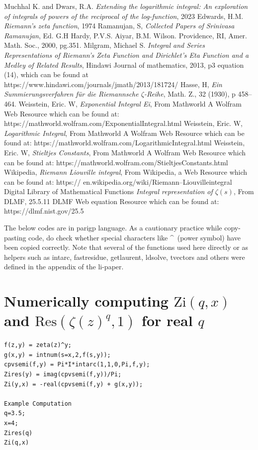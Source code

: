 \documentclass[a4paper,11pt,twoside]{amsart}
\newcommand\Zi{\mathrm{Zi}}
\newcommand\Res{\mathrm{Res}}
\begin{document}
\begin{thebibliography}{99} 
Muchhal K. and Dwars, R.A. \emph{Extending the logarithmic integral: An exploration of integrals of powers of the reciprocal of the log-function}, 2023
Edwards, H.M. \emph{Riemann's zeta function}, 1974
Ramanujan, S, \emph{Collected Papers of Srinivasa Ramanujan}, Ed. G.H Hardy, P.V.S. Aiyar, B.M. Wilson. Providence, RI, Amer. Math. Soc., 2000, pg.351.
Milgram, Michael S.  \emph{Integral and Series Representations of Riemann's Zeta Function and Dirichlet's Eta Function and a Medley of Related Results}, Hindawi Journal of mathematics, 2013, p3 equation (14), which can be found at https://www.hindawi.com/journals/jmath/2013/181724/
Hasse, H, \emph{Ein Summierungsverfahren für die Riemannsche $\zeta$-Reihe}, Math. Z., 32 (1930), p 458–464.
Weisstein, Eric. W, \emph{Exponential Integral Ei}, From Mathworld A Wolfram Web Resource which can be found at: https://mathworld.wolfram.com/ExponentialIntegral.html
Weisstein, Eric. W, \emph{Logarithmic Integral}, From Mathworld A Wolfram Web Resource which can be found at: https://mathworld.wolfram.com/LogarithmicIntegral.html
Weisstein, Eric. W, \emph{Stieltjes Constants}, From Mathworld A Wolfram Web Resource which can be found at:   https://mathworld.wolfram.com/StieltjesConstants.html
Wikipedia, \emph{Riemann Liouville integral}, From Wikipedia, a Web Resource which can be found at:  https://
en.wikipedia.org/wiki/Riemann–Liouvilleintegral
Digital Library of Mathematical Functions \emph{Integral representation of $\zeta(s)$}, From DLMF, 25.5.11	DLMF Web equation  Resource which can be found at:  https://dlmf.nist.gov/25.5
\end{thebibliography} 

\appendix
\appendixpage
The below codes are in parigp language. As a cautionary practice while copy-pasting code, do check whether special characters like \textasciicircum \, (power symbol) have been copied correctly. Note that several of the functions used here directly or as helpers such as intarc, fastresidue, getlaurent, ldsolve, tvectors and others were defined in the appendix of the li-paper.

\section{Numerically computing $\Zi(q,x)$ and $\Res(\zeta(z)^{q}, 1)$ for real $q$}
\begin{verbatim}
f(z,y) = zeta(z)^y;
g(x,y) = intnum(s=x,2,f(s,y));
cpvsemi(f,y) = Pi*I*intarc(1,1,0,Pi,f,y);
Zires(y) = imag(cpvsemi(f,y))/Pi;
Zi(y,x) = -real(cpvsemi(f,y) + g(x,y));

Example Computation
q=3.5;
x=4;
Zires(q)
Zi(q,x)

\end{verbatim}
\end{document}
